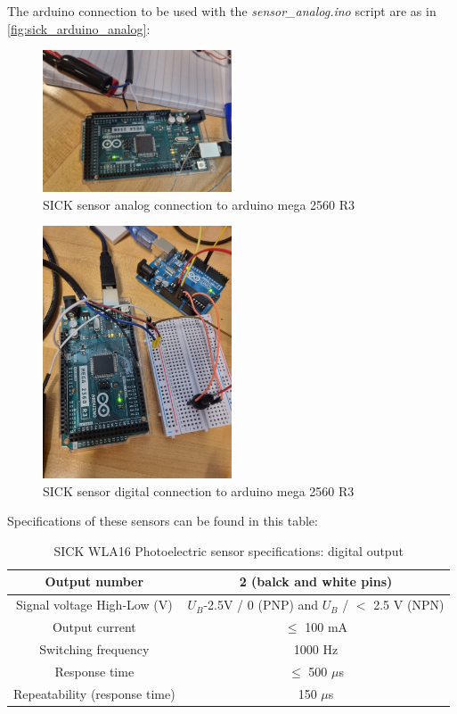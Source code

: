 \documentclass[a4paper]{article}
\begin{document}
The arduino connection to be used with the \textit{sensor\_analog.ino} script are as in \autoref{fig:sick_arduino_analog}:

\begin{figure}
	\centering
	\includegraphics[width=0.5\textwidth,angle=180]{SICK_arduino.jpg}
	\caption{SICK sensor analog connection to arduino mega 2560 R3}
	\label{fig:sick_arduino_analog}
\end{figure}

\begin{figure}[h!]
	\centering
	\includegraphics[width=0.5\textwidth]{arduino_tach.jpeg}
	\caption{SICK sensor digital connection to arduino mega 2560 R3}
	\label{fig:sick_arduino_digital}
\end{figure}

Specifications of these sensors can be found in this table:

\begin{table}[h!]
	\centering
	\caption{SICK WLA16 Photoelectric sensor specifications: digital output\label{tab:SICK16}}
	\begin{tabular}{||c | c ||} 
		\hline
		Output number & 2 (balck and white pins)\\ [0.5ex] 
		\hline
		Signal voltage High-Low (V) & $U_B$-2.5V / 0 (PNP) and $U_B$ / $<$ 2.5 V (NPN) \\ 
		\hline
		Output current & $\leq$ 100 mA \\
		\hline
		Switching frequency & 1000 Hz \\
		\hline
		Response time & $\leq$ 500 $\mu$s \\
		\hline
		Repeatability (response time) & 150 $\mu$s \\
		\hline
	\end{tabular}
\end{table}
\end{document}
